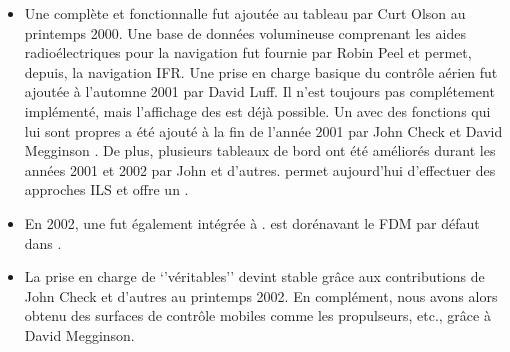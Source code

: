 {\begin{itemize}
\JSBSim, comme il fut appel\'{e} par la suite, rempla\c{c}a LaRCsim comme  () par d\'{e}faut,
 et il est pr\'{e}vu d'ajouter des fonctionnalit\'{e}s comme les effets d\^{u}s de car\`{e}ne dus au carburant, la turbulence, des syst\`{e}mes complets de contr\^{o}le du vol,
 et d'autres fonctionnalit\'{e}s g\'{e}n\'{e}ralement non pr\'{e}sentes ensembles dans un simulateur de vol. Comme alternative,
 Andy Ross ajouta un autre mod\`{e}le de dynamique de vol appel\'{e} \YASim{} (Yet Another Flight Dynamics Simulator, encore
 un autre simulateur de dynamique de vol), qui a pour but de pouvoir \^{e}tre utilis\'{e} faciliment, en s'appuyant sur la dynamique des fluides, fin 2001.
 Il nous permit d'obtenir des mod\`{e}les de vol pour un 747, un A4 et un DC-3. Alternativement, un groupe form\'{e} autour de
 Michael Selig du group  fournit un autre mod\`{e}le de vol avec d'autres a\'{e}ronefs autour de l'ann\'{e}e 2000.
\item Une  compl\`{e}te et fonctionnalle fut ajout\'{e}e au tableau par Curt Olson au printemps 2000. Une base de donn\'{e}es volumineuse comprenant
 les aides radio\'{e}lectriques pour la navigation fut fournie par Robin Peel et permet, depuis, la navigation IFR.
 Une prise en charge basique du contr\^{o}le a\'{e}rien  fut ajout\'{e}e \`{a} l'automne 2001 par David Luff. Il n'est toujours pas compl\'{e}tement impl\'{e}ment\'{e},
 mais l'affichage des  est d\'{e}j\`{a} possible. Un  avec des fonctions qui lui sont
 propres a \'{e}t\'{e} ajout\'{e} \`{a} la fin de l'ann\'{e}e 2001 par John Check et David Megginson . De plus, plusieurs tableaux de bord ont \'{e}t\'{e}
 am\'{e}lior\'{e}s durant les ann\'{e}es 2001 et 2002 par John et d'autres. \FlightGear{} permet aujourd'hui d'effectuer des approches ILS et offre un .
\item En 2002, une  fut \'{e}galement int\'{e}gr\'{e}e \`{a} \FlightGear{}. \JSBSim{} est dor\'{e}navant le FDM par d\'{e}faut dans \FlightGear{}.
\item La prise en charge de `'v\'{e}ritables''  devint stable gr\^{a}ce aux contributions de John Check et d'autres au printemps 2002.
 En compl\'{e}ment, nous avons alors obtenu des surfaces de contr\^{o}le mobiles  comme les
 propulseurs, etc., gr\^{a}ce \`{a} David Megginson.
\end{itemize}
}{}


